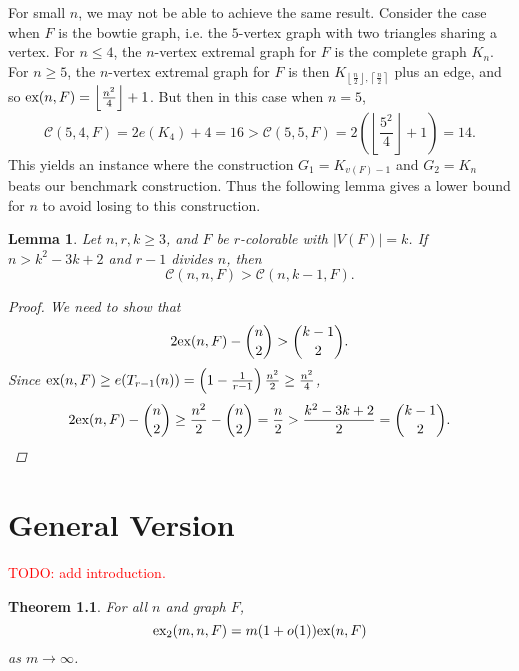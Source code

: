 \documentclass[10pt, reqno]{report}
\newtheorem{theorem}{Theorem}[chapter]
\newtheorem{lemma}[theorem]{Lemma}
\newtheorem{corollary}[theorem]{Corollary}
\newcommand*{\ex}{\textnormal{ex}}
\newcommand*{\dex}{\textnormal{ex}_2}
\newcommand*{\con}{\mathcal{C}}
\begin{document}


For small $n$, we may not be able to achieve the same result. Consider the case when $F$ is the bowtie graph, i.e. the $5$-vertex graph with two triangles sharing a vertex. For $n \leq 4$, the $n$-vertex extremal graph for $F$ is the complete graph $K_n$. For $n \geq 5$, the $n$-vertex extremal graph for $F$ is then $K_{\left\lfloor\frac{n}{2}\right\rfloor, \left\lceil\frac{n}{2}\right\rceil}$ plus an edge, and so $\ex(n, F) = \left\lfloor\frac{n^2}{4}\right\rfloor + 1$. But then in this case when $n = 5$, 
\[
  \con(5, 4, F) = 2e(K_4) + 4 = 16 > \con(5, 5, F) = 2\left(\left\lfloor\frac{5^2}{4}\right\rfloor + 1\right) = 14.
\]
This yields an instance where the construction $G_1 = K_{v(F) - 1}$ and $G_2 = K_n$ beats our benchmark construction. Thus the following lemma gives a lower bound for $n$ to avoid losing to this construction.

\begin{lemma}
  Let $n, r, k \geq 3$, and $F$ be $r$-colorable with $|V(F)| = k$. If $n > k^2 - 3k + 2$ and $r - 1$ divides $n$, then 
  \[
    \con(n, n, F) > \con(n, k - 1, F).
  \]
  \begin{proof}
    We need to show that
    \[
      2\ex(n, F) - \binom{n}{2} > \binom{k - 1}{2}.
    \]
    Since $\ex(n, F) \geq e(T_{r - 1}(n)) = \left(1 - \frac{1}{r - 1}\right)\frac{n^2}{2} \geq \frac{n^2}{4}$,
    \[
      2\ex(n, F) - \binom{n}{2} \geq \frac{n^2}{2} - \binom{n}{2} = \frac{n}{2} > \frac{k^2 - 3k + 2}{2} = \binom{k - 1}{2}.
    \]
  \end{proof}
\end{lemma}

\chapter{General Version}

\textcolor{red}{TODO: add introduction.}

\begin{theorem}
  For all $n$ and graph $F$,
  \[
    \dex(m, n, F) = m(1 + o(1))\ex(n, F)
  \]
  as $m \to \infty$.
\end{theorem}
\end{document}
